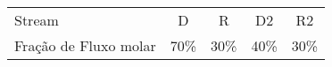\documentclass[\mainfilename]{subfiles}
\begin{document}
\begin{sectionBox}
    \begin{center}
        \vspace{1ex}
        \begin{tabular}{l *{4}{c}}
            \toprule
            
                Stream
                & D & R & D2 & R2
                \\ Fração de Fluxo molar
                & 70\%
                & 30\%
                & 40\%
                & 30\%
            
            \\\bottomrule
        \end{tabular}
        \\[1ex]
        \vspace{2ex}
    \end{center}
    
\end{sectionBox}
\end{document}

